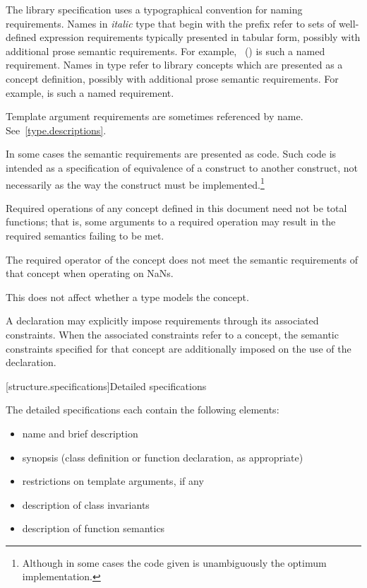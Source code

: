 \pnum
The library specification uses a typographical convention for naming
requirements. Names in \textit{italic} type that begin with the prefix
\oldconcept{} refer to sets of well-defined expression requirements typically
presented in tabular form, possibly with additional prose semantic requirements.
For example, ~() is such a named
requirement. Names in  type refer to library concepts
which are presented as a concept definition, possibly with additional
prose semantic requirements. For example,
is such a named requirement.

\pnum
Template argument requirements are sometimes referenced by name.
See~\ref{type.descriptions}.

\pnum
In some cases the semantic requirements are presented as \Cpp{} code.
Such code is intended as a
specification of equivalence of a construct to another construct, not
necessarily as the way the construct
must be implemented.\footnote{Although in some cases the code given is
unambiguously the optimum implementation.}

\pnum
Required operations of any concept defined in this document need not be
total functions; that is, some arguments to a required operation may
result in the required semantics failing to be met.
\begin{example}
The required \tcode{<} operator of the 
concept does not meet the
semantic requirements of that concept when operating on NaNs.
\end{example}
This does not affect whether a type models the concept.

\pnum
A declaration may explicitly impose requirements through its associated
constraints. When the associated constraints refer to a
concept, the semantic constraints specified for that concept
are additionally imposed on the use of the declaration.

[structure.specifications]{Detailed specifications}

\pnum
The detailed specifications each contain the following elements:%

\begin{itemize}
\item name and brief description
\item synopsis (class definition or function declaration, as appropriate)
\item restrictions on template arguments, if any
\item description of class invariants
\item description of function semantics
\end{itemize}

